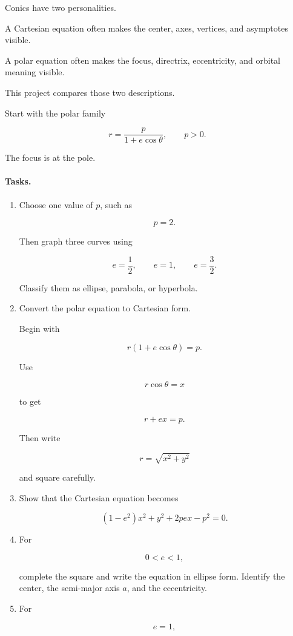 Conics have two personalities.

A Cartesian equation often makes the center, axes, vertices, and asymptotes visible.

A polar equation often makes the focus, directrix, eccentricity, and orbital meaning
visible.

This project compares those two descriptions.

Start with the polar family

\[
r=\frac{p}{1+e\cos\theta},
\qquad p>0.
\]

The focus is at the pole.

\paragraph{Tasks.}

\begin{enumerate}
\item Choose one value of \(p\), such as

\[
p=2.
\]

Then graph three curves using

\[
e=\frac12,
\qquad
e=1,
\qquad
e=\frac32.
\]

Classify them as ellipse, parabola, or hyperbola.

\item Convert the polar equation to Cartesian form.

Begin with

\[
r(1+e\cos\theta)=p.
\]

Use

\[
r\cos\theta=x
\]

to get

\[
r+ex=p.
\]

Then write

\[
r=\sqrt{x^2+y^2}
\]

and square carefully.

\item Show that the Cartesian equation becomes

\[
(1-e^2)x^2+y^2+2pex-p^2=0.
\]

\item For

\[
0<e<1,
\]

complete the square and write the equation in ellipse form.  Identify the center, the
semi-major axis \(a\), and the eccentricity.

\item For

\[
e=1,
\]


\end{enumerate}
